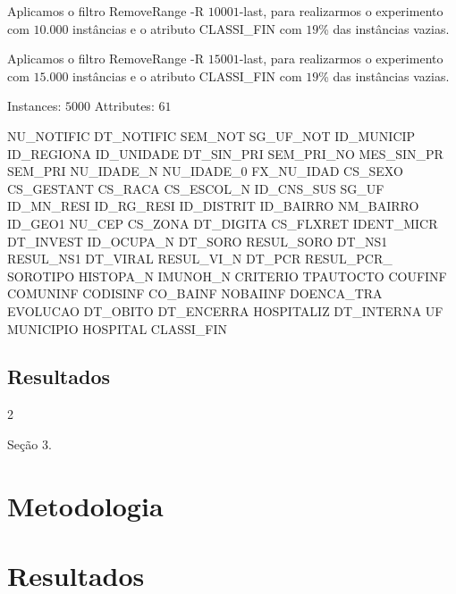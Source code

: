 \documentclass[
	12pt,				%
	openright,			%
	oneside,	
	a4paper,				%
	english,				%
	brazil				%
]{abntex2/abntex2} %
\begin{document}
		Aplicamos o filtro RemoveRange -R $10001$-last, para realizarmos o experimento com $10.000$ instâncias e o atributo CLASSI_FIN com $19$\% das instâncias vazias.
		
		Aplicamos o filtro RemoveRange -R $15001$-last, para realizarmos o experimento com $15.000$ instâncias e o atributo CLASSI_FIN com $19$\% das instâncias vazias.
		
		Instances:    $5000$
		Attributes:  $61$
		
		NU_NOTIFIC
		DT_NOTIFIC
		SEM_NOT
		SG_UF_NOT
		ID_MUNICIP
		ID_REGIONA
		ID_UNIDADE
		DT_SIN_PRI
		SEM_PRI_NO
		MES_SIN_PR
		SEM_PRI
		NU_IDADE_N
		NU_IDADE_0
		FX_NU_IDAD
		CS_SEXO
		CS_GESTANT
		CS_RACA
		CS_ESCOL_N
		ID_CNS_SUS
		SG_UF
		ID_MN_RESI
		ID_RG_RESI
		ID_DISTRIT
		ID_BAIRRO
		NM_BAIRRO
		ID_GEO1
		NU_CEP
		CS_ZONA
		DT_DIGITA
		CS_FLXRET
		IDENT_MICR
		DT_INVEST
		ID_OCUPA_N
		DT_SORO
		RESUL_SORO
		DT_NS1
		RESUL_NS1
		DT_VIRAL
		RESUL_VI_N
		DT_PCR
		RESUL_PCR_
		SOROTIPO
		HISTOPA_N
		IMUNOH_N
		CRITERIO
		TPAUTOCTO
		COUFINF
		COMUNINF
		CODISINF
		CO_BAINF
		NOBAIINF
		DOENCA_TRA
		EVOLUCAO
		DT_OBITO
		DT_ENCERRA
		HOSPITALIZ
		DT_INTERNA
		UF
		MUNICIPIO
		HOSPITAL
		CLASSI_FIN
		


	\section{Resultados}2
	
		Seção 3.
		
\chapter{Metodologia}

	
		
		
	
		
\chapter{Resultados}
\end{document}
